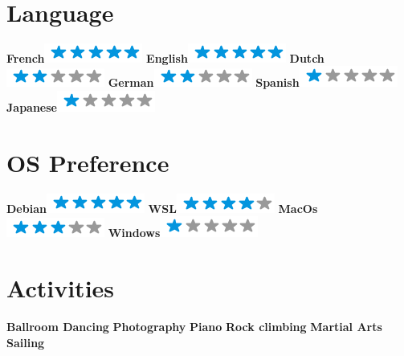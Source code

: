 \begin{aside}
	~
	\makecvsideheader%
	\section{Language}
	\textbf{French}\includegraphics[scale=0.40]{img/5stars.png}
	\textbf{English}\includegraphics[scale=0.40]{img/5stars.png}
	\textbf{Dutch}\includegraphics[scale=0.40]{img/2stars.png}
	\textbf{German}\includegraphics[scale=0.40]{img/2stars.png}
	\textbf{Spanish}\includegraphics[scale=0.40]{img/1stars.png}
	\textbf{Japanese}\includegraphics[scale=0.40]{img/1stars.png}
	~
	\section{OS Preference}
	\textbf{Debian}\includegraphics[scale=0.40]{img/5stars.png}
	\textbf{WSL}\includegraphics[scale=0.40]{img/4stars.png}
	\textbf{MacOs}\includegraphics[scale=0.40]{img/3stars.png}
	\textbf{Windows}\includegraphics[scale=0.40]{img/1stars.png}
	~
	\section{Activities}
	\textbf{Ballroom Dancing}
	\textbf{Photography}
	\textbf{Piano}
	\textbf{Rock climbing}
	\textbf{Martial Arts}
	\textbf{Sailing}
\end{aside}

